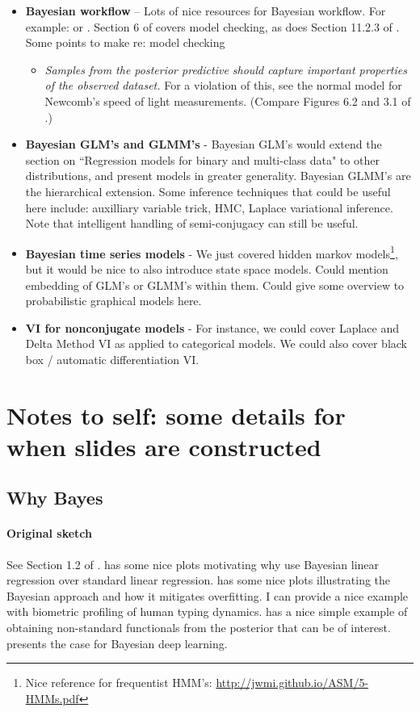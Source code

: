 \documentclass{article} %
\begin{document}
\begin{itemize}
\item \textbf{Bayesian workflow} -- Lots of nice resources for Bayesian workflow.    For example: \cite{gelman2020bayesian} or \cite{gabry2019visualization}.   Section 6 of \cite{gelman2013bayesian} covers model checking,  as does  Section 11.2.3 of \cite{davison2003statistical}.    Some points to make re: model checking
	\begin{itemize}
	\item \textit{Samples from the posterior predictive should capture important properties of the observed dataset.}  For a violation of this,  see the normal model for Newcomb's speed of light measurements.  (Compare Figures 6.2 and 3.1 of \cite{gelman2013bayesian}.)
	\end{itemize}
\item \textbf{Bayesian GLM's and GLMM's} - Bayesian GLM's would extend the section on ``Regression models for binary and multi-class data" to other distributions, and present models in greater generality.  Bayesian GLMM's are the hierarchical extension.  Some inference techniques that could be useful here include:  auxilliary variable trick, HMC, Laplace variational inference. Note that intelligent handling of semi-conjugacy can still be useful.
\item \textbf{Bayesian time series models} -  We just covered hidden markov models\footnote{Nice reference for frequentist HMM's: \url{http://jwmi.github.io/ASM/5-HMMs.pdf}}, but it would be nice to also introduce state space models.    Could mention embedding of GLM's or GLMM's within them.   Could give some overview to probabilistic graphical models here. 
\item \textbf{VI for nonconjugate models} - For instance, we could cover Laplace and Delta Method VI as applied to categorical models.   We could also cover black box / automatic differentiation VI.
\end{itemize}

\section{Notes to self:  some details for when slides are constructed}

\subsection{Why Bayes}

\paragraph{Original sketch} See Section 1.2 of \cite{hoff2009first}.   \cite{bishop2006pattern} has some nice plots motivating why use Bayesian linear regression over standard linear regression.   \cite{ghahramani2013bayesian}  has some nice plots illustrating the Bayesian approach and how it mitigates overfitting.   I can provide a nice example with biometric profiling of human typing dynamics.   \cite{held2006bayesian} has a nice simple example of obtaining non-standard functionals from the posterior that can be of interest.   \cite{wilson2020case} presents the case for Bayesian deep learning.  
\end{document}
